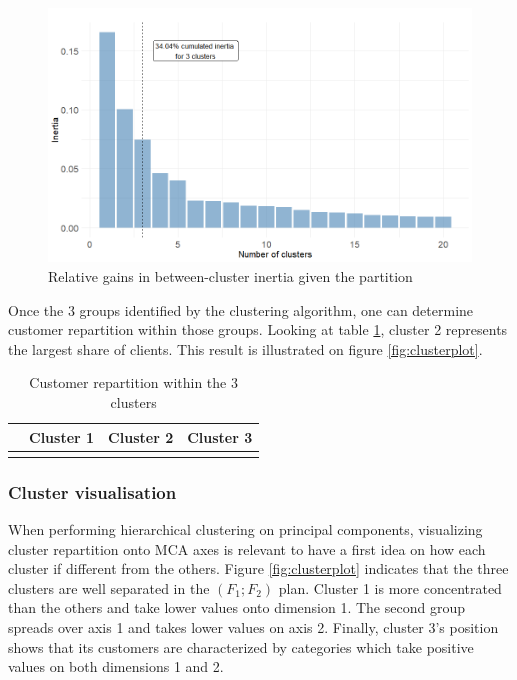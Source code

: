 \documentclass[
]{book}
\begin{document}
\begin{figure}

{\centering \includegraphics[width=13.89in]{./imgs/btw_inertia} 

}

\caption{Relative gains in between-cluster inertia given the partition}\label{fig:btwinertia}
\end{figure}

Once the 3 groups identified by the clustering algorithm, one can determine customer repartition within those groups. Looking at table \ref{tab:clustRepartition}, cluster 2 represents the largest share of clients. This result is illustrated on figure \ref{fig:clusterplot}.

\begin{table}[H]

\caption{\label{tab:clustRepartition}Customer repartition within the 3 clusters}
\centering
\begin{tabular}[t]{lrrr}
\toprule
  & Cluster 1 & Cluster 2 & Cluster 3\\
\midrule
\cellcolor{gray!6}{\%} & \cellcolor{gray!6}{26.55} & \cellcolor{gray!6}{41.38} & \cellcolor{gray!6}{32.07}\\
\bottomrule
\end{tabular}
\end{table}

\hypertarget{cluster-visualisation}{%
\subsubsection*{Cluster visualisation}\label{cluster-visualisation}}

When performing hierarchical clustering on principal components, visualizing cluster repartition onto MCA axes is relevant to have a first idea on how each cluster if different from the others. Figure \ref{fig:clusterplot} indicates that the three clusters are well separated in the \((F_1 ; F_2)\) plan. Cluster 1 is more concentrated than the others and take lower values onto dimension 1. The second group spreads over axis 1 and takes lower values on axis 2. Finally, cluster 3's position shows that its customers are characterized by categories which take positive values on both dimensions 1 and 2.
\end{document}
